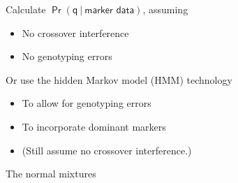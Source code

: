 \documentclass[12pt]{article}
\newcommand{\headsize}{\fontsize{35}{35} \selectfont}
\newcommand{\smallersize}{\fontsize{20}{25} \selectfont}
\begin{document}
\vspace{15mm}

\hfill
\begin{minipage}{10in}
\color{mywhite} \smallersize
Calculate {\color{myblue} $\mathsf{\Pr(q \ | \ \text{marker data})}$}, assuming
\begin{itemize}
\item No crossover interference
\item No genotyping errors
\end{itemize}

\vspace{10mm}

Or use the {\color{mypink} hidden Markov model (HMM)} technology
\begin{itemize}
\item To allow for genotyping errors
\item To incorporate dominant markers
\item {\color{myblue} (Still assume no crossover interference.)}
\end{itemize}
\end{minipage}




\newpage

\headsize \color{myyellow}
\hfill \begin{minipage}{5.75in}
\centering
The normal mixtures
\end{minipage}

\vspace{15mm}
\end{document}
